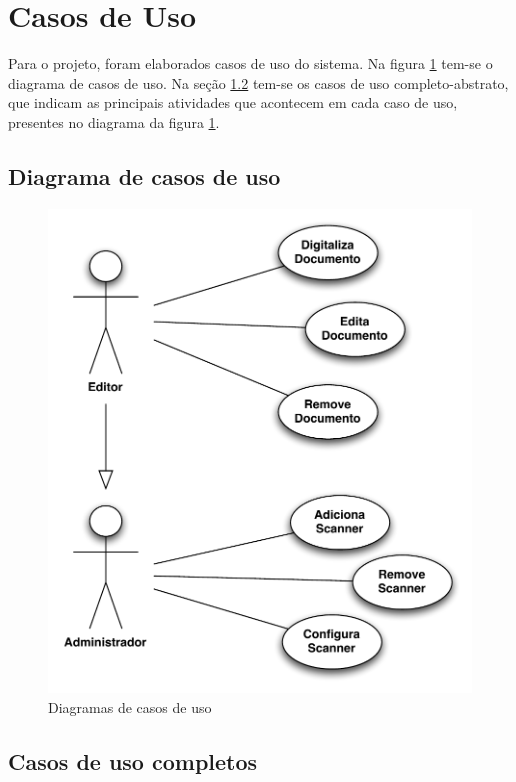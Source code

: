 
\section{Casos de Uso}
\label{sec:casos_de_uso}

Para o projeto, foram elaborados casos de uso do sistema. Na figura \ref{fig:casos_de_uso}
tem-se o diagrama de casos de uso. Na seção \ref{sec:casos_completos} tem-se os casos de uso
completo-abstrato, que indicam as principais atividades que acontecem em cada caso de uso, presentes no diagrama da figura \ref{fig:casos_de_uso}.

\subsection{Diagrama de casos de uso}
\begin{figure}[ht]
 \centering
  \includegraphics[scale=0.7]{img/use-case-diagram.pdf}
  \caption {Diagramas de casos de uso}
  \label{fig:casos_de_uso}
\end{figure}

\subsection{Casos de uso completos}
\label{sec:casos_completos}

